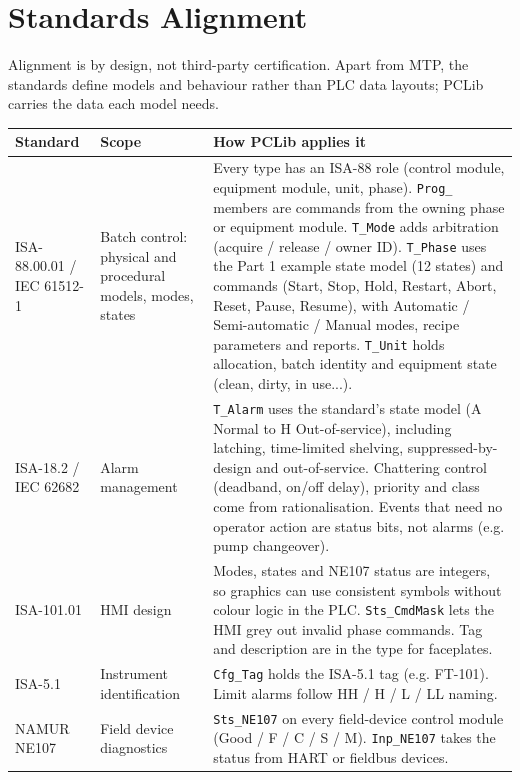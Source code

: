 \section{Standards Alignment}
\label{app:pclib:stds}
Alignment is by design, not third-party certification. Apart from MTP, the standards define models and behaviour rather than PLC data layouts; PCLib carries the data each model needs.
{\small
\begin{longtable}{@{}>{\raggedright\arraybackslash}p{3.2cm}>{\raggedright\arraybackslash}p{3.4cm}>{\raggedright\arraybackslash}p{7.8cm}@{}}
\toprule
\rowcolor{tblhead}\textbf{Standard} & \textbf{Scope} & \textbf{How PCLib applies it} \\
\midrule
\endhead
ISA-88.00.01 /\allowbreak{} IEC 61512-1 & Batch control: physical and procedural models, modes, states & Every type has an ISA-88 role (control module, equipment module, unit, phase). \texttt{Prog\_} members are commands from the owning phase or equipment module. \texttt{T\_Mode} adds arbitration (acquire /\allowbreak{} release /\allowbreak{} owner ID). \texttt{T\_Phase} uses the Part 1 example state model (12 states) and commands (Start, Stop, Hold, Restart, Abort, Reset, Pause, Resume), with Automatic /\allowbreak{} Semi-automatic /\allowbreak{} Manual modes, recipe parameters and reports. \texttt{T\_Unit} holds allocation, batch identity and equipment state (clean, dirty, in use...). \\
ISA-18.2 /\allowbreak{} IEC 62682 & Alarm management & \texttt{T\_Alarm} uses the standard's state model (A Normal to H Out-of-service), including latching, time-limited shelving, suppressed-by-design and out-of-service. Chattering control (deadband, on/\allowbreak{}off delay), priority and class come from rationalisation. Events that need no operator action are status bits, not alarms (e.g. pump changeover). \\
ISA-101.01 & HMI design & Modes, states and NE107 status are integers, so graphics can use consistent symbols without colour logic in the PLC. \texttt{Sts\_CmdMask} lets the HMI grey out invalid phase commands. Tag and description are in the type for faceplates. \\
ISA-5.1 & Instrument identification & \texttt{Cfg\_Tag} holds the ISA-5.1 tag (e.g. FT-101). Limit alarms follow HH /\allowbreak{} H /\allowbreak{} L /\allowbreak{} LL naming. \\
NAMUR NE107 & Field device diagnostics & \texttt{Sts\_NE107} on every field-device control module (Good /\allowbreak{} F /\allowbreak{} C /\allowbreak{} S /\allowbreak{} M). \texttt{Inp\_NE107} takes the status from HART or fieldbus devices. \\

\end{longtable}}
